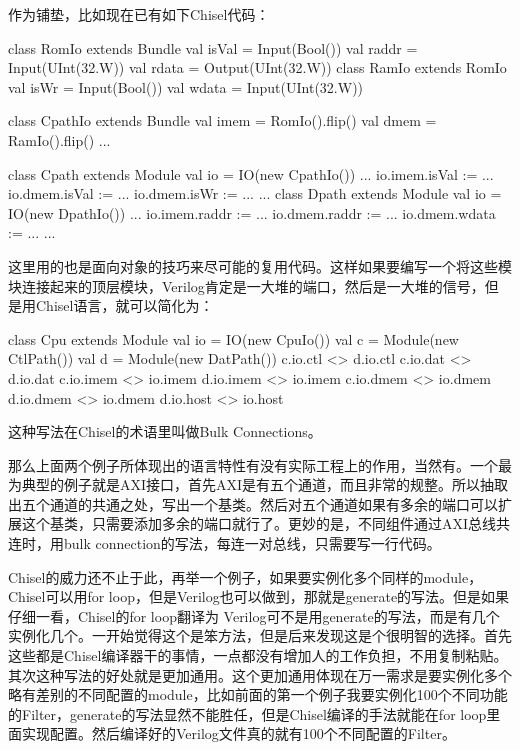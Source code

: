 \documentclass[twocolumn,10pt]{article}
\begin{document}
	作为铺垫，比如现在已有如下Chisel代码：
	\begin{scala}
class RomIo extends Bundle {
	val isVal = Input(Bool())
	val raddr = Input(UInt(32.W))
	val rdata = Output(UInt(32.W))
}
class RamIo extends RomIo {
	val isWr = Input(Bool())
	val wdata = Input(UInt(32.W))
}

class CpathIo extends Bundle {
	val imem = RomIo().flip()
	val dmem = RamIo().flip()
	...
}

class Cpath extends Module {
	val io = IO(new CpathIo())
	...
	io.imem.isVal := ...
	io.dmem.isVal := ...
	io.dmem.isWr := ...
	...
}
class Dpath extends Module {
	val io = IO(new DpathIo())
	...
	io.imem.raddr := ...
	io.dmem.raddr := ...
	io.dmem.wdata := ...
	...
}
	\end{scala}
	这里用的也是面向对象的技巧来尽可能的复用代码。这样如果要编写一个将这些模块连接起来的顶层模块，Verilog肯定是一大堆的端口，然后是一大堆的信号，但是用Chisel语言，就可以简化为：
	\begin{scala}
	class Cpu extends Module {
		val io = IO(new CpuIo())
		val c = Module(new CtlPath())
		val d = Module(new DatPath())
		c.io.ctl <> d.io.ctl
		c.io.dat <> d.io.dat
		c.io.imem <> io.imem
		d.io.imem <> io.imem
		c.io.dmem <> io.dmem
		d.io.dmem <> io.dmem
		d.io.host <> io.host
	}
	\end{scala}
	这种写法在Chisel的术语里叫做Bulk Connections。
	
	那么上面两个例子所体现出的语言特性有没有实际工程上的作用，当然有。一个最为典型的例子就是AXI接口，首先AXI是有五个通道，而且非常的规整。所以抽取出五个通道的共通之处，写出一个基类。然后对五个通道如果有多余的端口可以扩展这个基类，只需要添加多余的端口就行了。更妙的是，不同组件通过AXI总线共连时，用bulk connection的写法，每连一对总线，只需要写一行代码。
	
	Chisel的威力还不止于此，再举一个例子，如果要实例化多个同样的module，Chisel可以用for loop，但是Verilog也可以做到，那就是generate的写法。但是如果仔细一看，Chisel的for loop翻译为
	Verilog可不是用generate的写法，而是有几个实例化几个。一开始觉得这个是笨方法，但是后来发现这是个很明智的选择。首先这些都是Chisel编译器干的事情，一点都没有增加人的工作负担，不用复制粘贴。其次这种写法的好处就是更加通用。这个更加通用体现在万一需求是要实例化多个略有差别的不同配置的module，比如前面的第一个例子我要实例化100个不同功能的Filter，generate的写法显然不能胜任，但是Chisel编译的手法就能在for loop里面实现配置。然后编译好的Verilog文件真的就有100个不同配置的Filter。
	
\end{document}
